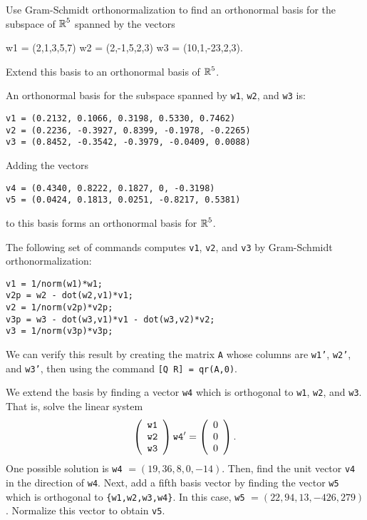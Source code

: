 \documentclass{ximera}
\begin{document}
\begin{computerExercise} \label{c7.5.4}
Use Gram-Schmidt orthonormalization to find an orthonormal basis for the
subspace of $\mbox{$\mathbb{R}$}^5$ spanned by the vectors
\begin{matlabEquation}\label{MATLAB:61}
w1 = (2,1,3,5,7) \quad w2 = (2,-1,5,2,3) \AND w3 = (10,1,-23,2,3).
\end{matlabEquation}
Extend this basis to an orthonormal basis of $\mbox{$\mathbb{R}$}^5$.

\begin{solution}

\ans
An orthonormal basis for the subspace spanned by {\tt w1}, {\tt w2},
and {\tt w3} is:
\begin{verbatim}
v1 = (0.2132, 0.1066, 0.3198, 0.5330, 0.7462)
v2 = (0.2236, -0.3927, 0.8399, -0.1978, -0.2265)
v3 = (0.8452, -0.3542, -0.3979, -0.0409, 0.0088)
\end{verbatim}
Adding the vectors
\begin{verbatim}
v4 = (0.4340, 0.8222, 0.1827, 0, -0.3198)
v5 = (0.0424, 0.1813, 0.0251, -0.8217, 0.5381)
\end{verbatim}
to this basis forms an orthonormal basis for $\mbox{$\mathbb{R}$}^5$.

\soln The following set of \Matlab commands computes {\tt v1}, {\tt v2},
and {\tt v3} by Gram-Schmidt orthonormalization:
\begin{verbatim}
v1 = 1/norm(w1)*w1;
v2p = w2 - dot(w2,v1)*v1;
v2 = 1/norm(v2p)*v2p;
v3p = w3 - dot(w3,v1)*v1 - dot(w3,v2)*v2;
v3 = 1/norm(v3p)*v3p;
\end{verbatim}
We can verify this result by creating the matrix {\tt A} whose columns
are {\tt w1'}, {\tt w2'}, and {\tt w3'}, then using the command
{\tt [Q R] = qr(A,0)}.

\para We extend the basis by finding a vector {\tt w4} which is
orthogonal to {\tt w1}, {\tt w2}, and {\tt w3}.  That is, solve the
linear system
\[
\left(\begin{array}{r} {\tt w1} \\ {\tt w2} \\ {\tt w3}\end{array}\right){\tt w4'} = \left(\begin{array}{r} 0 \\ 0 \\ 0\end{array}\right). \]
One possible solution is {\tt w4} $= (19,36,8,0,-14)$.  Then, find
the unit vector {\tt v4} in the direction of {\tt w4}.  Next, add a
fifth basis vector by finding the vector {\tt w5} which is orthogonal
to {\tt \{w1,w2,w3,w4\}}.  In this case, {\tt w5}
$= (22,94,13,-426,279)$.  Normalize this vector to obtain {\tt v5}.




\end{solution}
\end{computerExercise}
\end{document}
